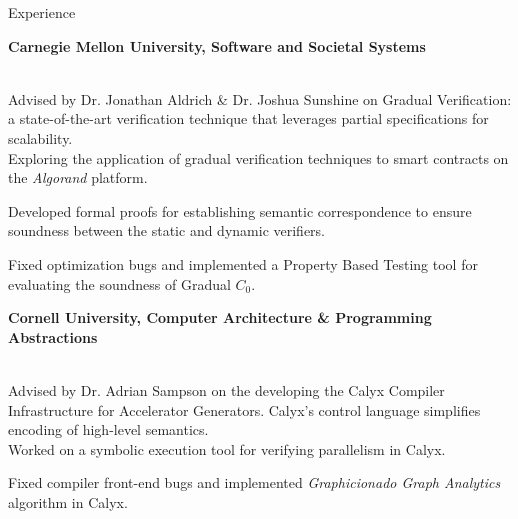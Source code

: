 \begin{rSection}{Experience}
	{\textbf{\large{Carnegie Mellon University, Software and Societal Systems}} \hfill \color{darkgray}{06/2022 - Present} 
	\\ \vspace*{2mm}
	 \hfill \color{darkgray}{Pittsburgh, PA} 
	\\ 
	\color{black}
	\begin{minipage}{40em}
		Advised by Dr. Jonathan Aldrich \& Dr. Joshua Sunshine on Gradual Verification: a state-of-the-art verification technique that leverages partial specifications for scalability. \\
		\color{black}Exploring the application of gradual verification techniques to smart contracts on the \textit{Algorand} platform.

		\color{black}Developed formal proofs for establishing semantic correspondence to ensure soundness between the static and dynamic verifiers.

		\color{black}Fixed optimization bugs and implemented a Property Based Testing tool for evaluating the soundness of Gradual $C_0$.
	\end{minipage}}
	
	\vspace*{2mm}

	{\textbf{\large{Cornell University, Computer Architecture \& Programming Abstractions}} \hfill \color{darkgray}{10/2021 - 12/2022} 
	\\ \vspace*{2mm}
	 \hfill \color{darkgray}{Ithaca, NY}
	\\
	\color{black}
	\begin{minipage}{40em}
		Advised by Dr. Adrian Sampson on the developing the Calyx Compiler Infrastructure for Accelerator Generators. Calyx's control language simplifies encoding of high-level semantics. \\
		\color{black} Worked on a symbolic execution tool for verifying parallelism in Calyx.

		\color{black} Fixed compiler front-end bugs and implemented \textit{Graphicionado Graph Analytics} algorithm in Calyx.
	\end{minipage}} 

	\vspace*{2mm}

\end{rSection} 
